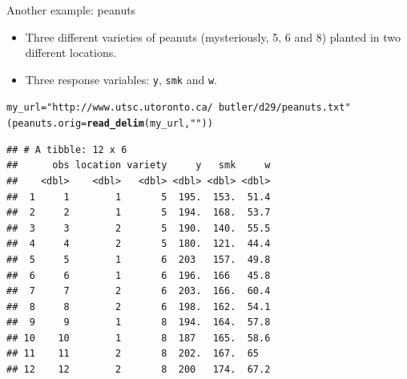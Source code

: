 \documentclass[unknownkeysallowed]{beamer}\usepackage[]{graphicx}\usepackage[]{color}
\makeatletter
\newcommand{\hlstr}[1]{\textcolor[rgb]{0.192,0.494,0.8}{#1}}%
\newcommand{\hlopt}[1]{\textcolor[rgb]{0,0,0}{#1}}%
\newcommand{\hlstd}[1]{\textcolor[rgb]{0.345,0.345,0.345}{#1}}%
\newcommand{\hlkwb}[1]{\textcolor[rgb]{0.69,0.353,0.396}{#1}}%
\newcommand{\hlkwc}[1]{\textcolor[rgb]{0.333,0.667,0.333}{#1}}%
\newcommand{\hlkwd}[1]{\textcolor[rgb]{0.737,0.353,0.396}{\textbf{#1}}}%
\newenvironment{kframe}{%
 \def\at@end@of@kframe{}%
 \ifinner\ifhmode%
  \def\at@end@of@kframe{\end{minipage}}%
  \begin{minipage}{\columnwidth}%
 \fi\fi%
 \def\FrameCommand##1{\hskip\@totalleftmargin \hskip-\fboxsep
 \colorbox{shadecolor}{##1}\hskip-\fboxsep
     \hskip-\linewidth \hskip-\@totalleftmargin \hskip\columnwidth}%
 \MakeFramed {\advance\hsize-\width
   \@totalleftmargin\z@ \linewidth\hsize
   \@setminipage}}%
 {\par\unskip\endMakeFramed%
 \at@end@of@kframe}
\newenvironment{knitrout}{}{} %
\makeatother
\begin{document}
\begin{frame}[fragile]{Another example: peanuts}

  \begin{itemize}
  \item  Three different varieties
of peanuts (mysteriously, 5, 6 and 8) planted in two different
locations.
\item Three response variables: \texttt{y}, \texttt{smk} and
\texttt{w}.
  \end{itemize}

 
\begin{knitrout}\footnotesize
{}\color{fgcolor}\begin{kframe}
\begin{alltt}
\hlstd{my_url}\hlkwb{=}\hlstr{"http://www.utsc.utoronto.ca/~butler/d29/peanuts.txt"}
\hlstd{(peanuts.orig}\hlkwb{=}\hlkwd{read_delim}\hlstd{(my_url,}\hlstr{" "}\hlstd{))}
\end{alltt}
\begin{verbatim}
## # A tibble: 12 x 6
##      obs location variety     y   smk     w
##    <dbl>    <dbl>   <dbl> <dbl> <dbl> <dbl>
##  1     1        1       5  195.  153.  51.4
##  2     2        1       5  194.  168.  53.7
##  3     3        2       5  190.  140.  55.5
##  4     4        2       5  180.  121.  44.4
##  5     5        1       6  203   157.  49.8
##  6     6        1       6  196.  166   45.8
##  7     7        2       6  203.  166.  60.4
##  8     8        2       6  198.  162.  54.1
##  9     9        1       8  194.  164.  57.8
## 10    10        1       8  187   165.  58.6
## 11    11        2       8  202.  167.  65  
## 12    12        2       8  200   174.  67.2
\end{verbatim}
\end{kframe}
\end{knitrout}
    
    
\end{frame}

\end{document}
